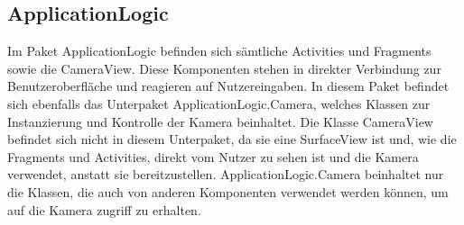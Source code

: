 \label{app:module:applicationlogic}\subsection{ApplicationLogic}
Im Paket ApplicationLogic befinden sich sämtliche Activities und Fragments sowie die CameraView. Diese Komponenten stehen in direkter Verbindung zur Benutzeroberfläche und reagieren auf Nutzereingaben. In diesem Paket befindet sich ebenfalls das Unterpaket ApplicationLogic.Camera, welches Klassen zur Instanzierung und Kontrolle der Kamera beinhaltet. Die Klasse CameraView befindet sich nicht in diesem Unterpaket, da sie eine SurfaceView ist und, wie die Fragments und Activities, direkt vom Nutzer zu sehen ist und die Kamera verwendet, anstatt sie bereitzustellen. ApplicationLogic.Camera beinhaltet nur die Klassen, die auch von anderen Komponenten verwendet werden können, um auf die Kamera zugriff zu erhalten.